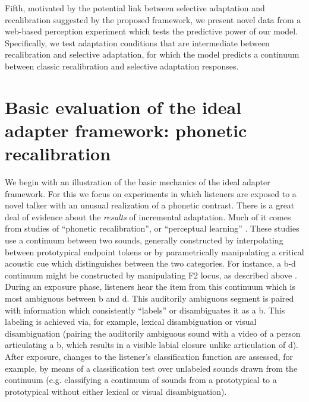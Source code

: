 Fifth, motivated by the potential link between selective adaptation and recalibration suggested by the proposed framework, we present novel data from a web-based perception experiment which tests the predictive power of our model. Specifically, we test adaptation conditions that are intermediate between recalibration and selective adaptation, for which the model predicts a continuum between classic recalibration and selective adaptation responses. %



\section{Basic evaluation of the ideal adapter framework: phonetic recalibration}
\label{sec:model-recal}

We begin with an illustration of the basic mechanics of the ideal adapter framework. For this we focus on experiments in which listeners are exposed to a novel talker with an unusual realization of a phonetic contrast. There is a great deal of evidence about the \emph{results} of incremental adaptation. Much of it comes from studies of ``phonetic recalibration'', or ``perceptual learning'' \cite{Bertelson2003,Kraljic2005,Norris2003}.  These studies use a continuum between two sounds, generally constructed by interpolating between prototypical endpoint tokens \autocite[e.g.][]{Kraljic2005,Norris2003} or by parametrically manipulating a critical acoustic cue which distinguishes between the two categories.  For instance, a \ph b-\ph d continuum might be constructed by manipulating F2 locus, as described above \cite{Bertelson2003,Vroomen2004}.  During an exposure phase, listeners hear the item from this continuum which is most ambiguous between \ph b and \ph d.  This auditorily ambiguous segment is paired with information which consistently ``labels'' or disambiguates it as a \ph b.  This labeling is achieved via, for example, lexical disambiguation \autocite[e.g. replacing the \ph b in \emph{club} with the ambiguous segment,][etc.]{Kraljic2005,Norris2003} or visual disambiguation (pairing the auditorily ambiguous sound with a video of a person articulating a \ph b, which results in a visible labial closure unlike articulation of \ph d).  After exposure, changes to the listener's classification function are assessed, for example, by means of a classification test over unlabeled sounds drawn from the continuum (e.g. classifying a continuum of sounds from a prototypical  to a prototypical  without either lexical or visual disambiguation).

